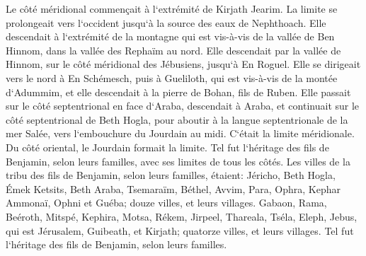 \verse Le côté méridional commençait à l`extrémité de Kirjath Jearim. La limite se prolongeait vers l`occident jusqu`à la source des eaux de Nephthoach. 
\verse Elle descendait à l`extrémité de la montagne qui est vis-à-vis de la vallée de Ben Hinnom, dans la vallée des Rephaïm au nord. Elle descendait par la vallée de Hinnom, sur le côté méridional des Jébusiens, jusqu`à En Roguel. 
\verse Elle se dirigeait vers le nord à En Schémesch, puis à Gueliloth, qui est vis-à-vis de la montée d`Adummim, et elle descendait à la pierre de Bohan, fils de Ruben. 
\verse Elle passait sur le côté septentrional en face d`Araba, descendait à Araba, 
\verse et continuait sur le côté septentrional de Beth Hogla, pour aboutir à la langue septentrionale de la mer Salée, vers l`embouchure du Jourdain au midi. C`était la limite méridionale. 
\verse Du côté oriental, le Jourdain formait la limite. Tel fut l`héritage des fils de Benjamin, selon leurs familles, avec ses limites de tous les côtés. 
\verse Les villes de la tribu des fils de Benjamin, selon leurs familles, étaient: Jéricho, Beth Hogla, Émek Ketsits, 
\verse Beth Araba, Tsemaraïm, Béthel, 
\verse Avvim, Para, Ophra, 
\verse Kephar Ammonaï, Ophni et Guéba; douze villes, et leurs villages. 
\verse Gabaon, Rama, Beéroth, 
\verse Mitspé, Kephira, Motsa, 
\verse Rékem, Jirpeel, Thareala, 
\verse Tséla, Eleph, Jebus, qui est Jérusalem, Guibeath, et Kirjath; quatorze villes, et leurs villages. Tel fut l`héritage des fils de Benjamin, selon leurs familles. 

